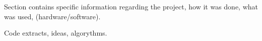 Section contains specific information regarding the project, how it was done, what was used, (hardware/software). 

Code extracts, ideas, algorythms.